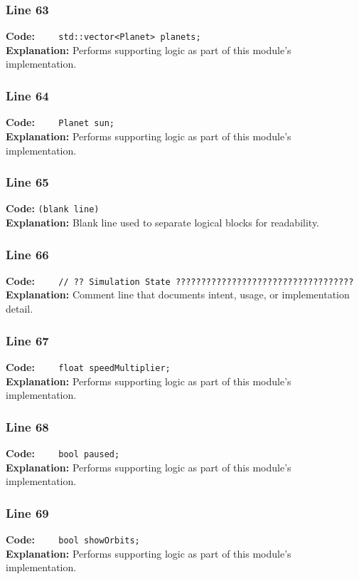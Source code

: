 \documentclass[11pt,a4paper]{article}
\begin{document}
\subsubsection*{Line 63}
\textbf{Code:} \verb|    std::vector<Planet> planets;|\\
\textbf{Explanation:} Performs supporting logic as part of this module's implementation.

\subsubsection*{Line 64}
\textbf{Code:} \verb|    Planet sun;|\\
\textbf{Explanation:} Performs supporting logic as part of this module's implementation.

\subsubsection*{Line 65}
\textbf{Code:} \texttt{(blank line)}\\
\textbf{Explanation:} Blank line used to separate logical blocks for readability.

\subsubsection*{Line 66}
\textbf{Code:} \verb|    // ?? Simulation State ???????????????????????????????????|\\
\textbf{Explanation:} Comment line that documents intent, usage, or implementation detail.

\subsubsection*{Line 67}
\textbf{Code:} \verb|    float speedMultiplier;|\\
\textbf{Explanation:} Performs supporting logic as part of this module's implementation.

\subsubsection*{Line 68}
\textbf{Code:} \verb|    bool paused;|\\
\textbf{Explanation:} Performs supporting logic as part of this module's implementation.

\subsubsection*{Line 69}
\textbf{Code:} \verb|    bool showOrbits;|\\
\textbf{Explanation:} Performs supporting logic as part of this module's implementation.
\end{document}
